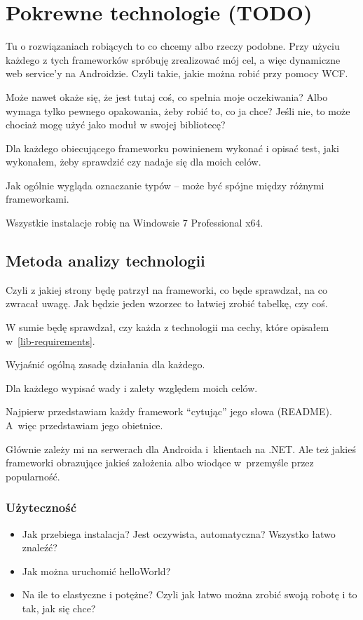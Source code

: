 \chapter{Pokrewne technologie (TODO)}
Tu o rozwiązaniach robiących to co chcemy albo rzeczy podobne. Przy użyciu każdego z tych frameworków spróbuję zrealizować mój cel, a więc dynamiczne web service'y na Androidzie. Czyli takie, jakie można robić przy pomocy WCF.

Może nawet okaże się, że jest tutaj coś, co spełnia moje oczekiwania? Albo wymaga tylko pewnego opakowania, żeby robić to, co ja chce?
Jeśli nie, to może chociaż mogę użyć jako moduł w swojej bibliotecę?

Dla każdego obiecującego frameworku powinienem wykonać i opisać test, jaki wykonałem, żeby sprawdzić czy nadaje się dla moich celów.

Jak ogólnie wygląda oznaczanie typów -- może być spójne między różnymi frameworkami.

Wszystkie instalacje robię na Windowsie 7 Professional x64.

\section{Metoda analizy technologii}
Czyli z jakiej strony będę patrzył na frameworki, co będe sprawdzał, na co zwracał uwagę. Jak będzie jeden wzorzec to łatwiej zrobić tabelkę, czy coś.

W sumie będę sprawdzał, czy każda z technologii ma cechy, które opisałem w~\ref{lib-requirements}.

Wyjaśnić ogólną zasadę działania dla każdego.

Dla każdego wypisać wady i zalety względem moich celów.

Najpierw przedstawiam każdy framework ``cytując'' jego słowa (README). A~więc przedstawiam jego obietnice.

Głównie zależy mi na serwerach dla Androida i~klientach na .NET\@. Ale też jakieś frameworki obrazujące jakieś założenia albo wiodące w~przemyśle przez popularność.

\subsection{Użyteczność}
\begin{itemize}
	\item Jak przebiega instalacja? Jest oczywista, automatyczna? Wszystko łatwo znaleźć?
	\item Jak można uruchomić helloWorld?
	\item Na ile to elastyczne i potężne? Czyli jak łatwo można zrobić swoją robotę i to tak, jak się chce?
\end{itemize}

